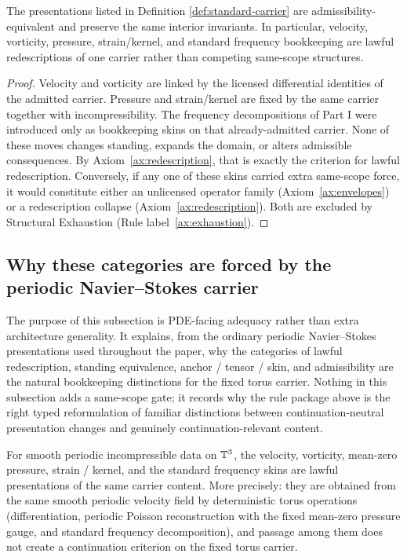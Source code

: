 \begin{lemma}\label{prop:equiv-completion-NS}
The presentations listed in Definition \ref{def:standard-carrier} are admissibility-equivalent and
preserve the same interior invariants. In particular, velocity, vorticity, pressure, strain/kernel, and
standard frequency bookkeeping are lawful redescriptions of one carrier rather than competing
same-scope structures.
\end{lemma}

\begin{proof}
Velocity and vorticity are linked by the licensed differential identities of the admitted carrier.
Pressure and strain/kernel are fixed by the same carrier together with incompressibility. The
frequency decompositions of Part I were introduced only as bookkeeping skins on that already-admitted
carrier. None of these moves changes standing, expands the domain, or alters admissible
consequences. By Axiom~\ref{ax:redescription}, that is exactly the criterion for lawful redescription.
Conversely, if any one of these skins carried extra same-scope force, it would constitute either an
unlicensed operator family (Axiom~\ref{ax:envelopes}) or a redescription collapse (Axiom~\ref{ax:redescription}).
Both are excluded by Structural Exhaustion (Rule label~\ref{ax:exhaustion}).

\end{proof}

\subsection{Why these categories are forced by the periodic Navier--Stokes carrier}
\label{subsec:pde-facing-adequacy}
The purpose of this subsection is PDE-facing adequacy rather than extra architecture generality.  It explains,
from the ordinary periodic Navier--Stokes presentations used throughout the paper, why the categories of
lawful redescription, standing equivalence, anchor / tensor / skin, and admissibility are the natural
bookkeeping distinctions for the fixed torus carrier.  Nothing in this subsection adds a same-scope
gate; it records why the rule package above is the right typed reformulation of familiar distinctions
between continuation-neutral presentation changes and genuinely continuation-relevant content.

\begin{proposition}
\label{prop:adequacy-lawful-redescription}
For smooth periodic incompressible data on $\mathbb{T}^3$, the velocity, vorticity, mean-zero pressure,
strain / kernel, and the standard frequency skins are lawful presentations of the same carrier content.
More precisely: they are obtained from the same smooth periodic velocity field by deterministic torus
operations (differentiation, periodic Poisson reconstruction with the fixed mean-zero pressure gauge,
and standard frequency decomposition), and passage among them does not create a continuation
criterion on the fixed torus carrier.
\end{proposition}

